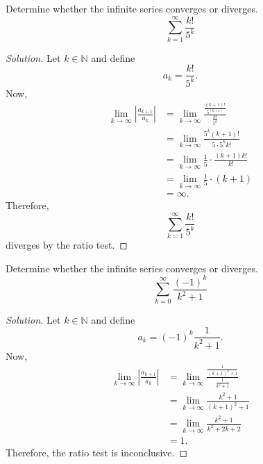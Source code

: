 \documentclass[compacto,10pt,comentarios]{aleph-notas}
\begin{document}
\begin{ejer}
    Determine whether the infinite series converges or diverges.
    $$
        \sum_{k=1}^{\infty} \frac{k!}{5^k}
    $$
\end{ejer}
\begin{proof}[Solution]
    Let $k \in \mathbb{N}$ and define
    $$
        a_k = \frac{k!}{5^{k}}.
    $$
    Now,
    \begin{align*}
        \lim_{k \to \infty} \left| \frac{a_{k+1}}{a_k} \right| 
        & = \lim_{k \to \infty} \frac{\frac{(k+1)!}{5^{(k + 1)}}}{\frac{k!}{5^{k}}} \\
        & = \lim_{k \to \infty} \frac{5^{k}(k+1)!}{5 \cdot 5^{k}k!} \\
        & = \lim_{k \to \infty} \frac{1}{5} \cdot \frac{(k+1)k!}{k!} \\
        & = \lim_{k \to \infty} \frac{1}{5} \cdot (k+1) \\
        & = \infty.
    \end{align*}
    Therefore,
    $$
    \sum_{k=1}^{\infty} \frac{k!}{5^k}
    $$
    diverges by the ratio test.
\end{proof}

\begin{ejer}
    Determine whether the infinite series converges or diverges.
    $$
        \sum_{k=0}^{\infty} \frac{(-1)^k}{k^2+1}
    $$
\end{ejer}
\begin{proof}[Solution]
    Let $k \in \mathbb{N}$ and define
    $$
        a_k = (-1)^k \frac{1}{k^2+1}.
    $$
    Now,
    \begin{align*}
        \lim_{k \to \infty} \left| \frac{a_{k+1}}{a_k} \right| 
        & = \lim_{k \to \infty} \frac{\frac{1}{(k+1)^2+1}}{\frac{1}{k^2+1}} \\
        & = \lim_{k \to \infty} \frac{k^2+1}{(k+1)^2+1} \\
        & = \lim_{k \to \infty} \frac{k^2+1}{k^2 + 2k + 2} \\
        & = 1.
    \end{align*}
    Therefore, the ratio test is inconclusive.
\end{proof}
\end{document}
